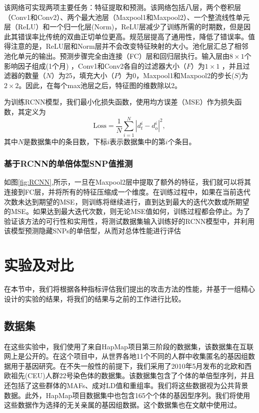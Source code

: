 该网络可实现两项主要任务：特征提取和预测。该网络包括八层，两个卷积层（Conv1和Conv2）、两个最大池层（Maxpool1和Maxpool2）、一个整流线性单元层（ReLU）和一个归一化层(Norm)，ReLU层减少了训练所需的时期数，但是因此其错误率比传统的双曲正切单位更高。规范层提高了通用性，降低了错误率。值得注意的是，ReLU层和Norm层并不会改变特征映射的大小。池化层汇总了相邻池化单元的输出。预测步骤完全由连接（FC）层和回归层执行。输入层由$8\times 1$个影响因子组成(1个月) ，Conv1和Conv2各自的过滤器大小（$F$）为$1\times 1$ ，并且过滤器的数量（$N$）为25，填充大小（$P$）为0，Maxpool1和Maxpool2的步长($S$)为$2\times 2$。因此，在每个max池层之后，特征图的维数除以2。


为训练RCNN模型，我们最小化损失函数，使用均方误差（MSE）作为损失函数，其定义为
\begin{equation}
\text{Loss}=\frac{1}{N}\sum_{i=1}^{N}|d_{t}^{i}-d_{o}^{i}|^{2},
\end{equation}
其中$N$是数据集中的条目数，下标$i$表示数据集中的第$i$个条目。

\subsubsection{基于RCNN的单倍体型SNP值推测}
如图\ref{fig:RCNN},所示，一旦在Maxpool2层中提取了额外的特征，我们就可以将其连接到FC层，并将所有的特征压缩成一个维度。在训练过程中，如果在当前迭代次数未达到期望的MSE，则训练将继续进行，直到达到最大的迭代次数或所期望的MSE。如果达到最大迭代次数，则无论MSE值如何，训练过程都会停止。为了验证该方法的可行性和实用性，将测试数据集输入训练好的RCNN模型中，并利用该模型预测隐藏SNPs的单倍型，从而对总体性能进行评估


\section{实验及对比}\label{sec:resul}
在本节中，我们将根据各种指标评估我们提出的攻击方法的性能，并基于一组精心设计的实验的结果，将我们的结果与之前的工作进行比较。

\subsection{数据集}
在这些实验中，我们使用了来自HapMap项目\cite{thorisson2005international}第三阶段的数据集，该数据集在互联网上是公开的。在这个项目中，从世界各地11个不同的人群中收集匿名的基因组数据用于基因研究。在不失一般性的前提下，我们采用了2010年5月发布的北欧和西欧祖先(CEU)人群22号染色体的数据集。该数据集包含了个体的单倍型序列，并且还包括了这些群体的MAFs、成对LD值和重组率。我们将这些数据视为公共背景数据。此外，HapMap项目数据集中也包含165个个体的基因型序列。我们将使用这些数据作为选择的无关亲属的基因组数据。这个数据集也在文献\cite{samani2015quantifying}中使用过。
